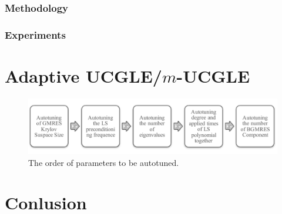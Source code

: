 \subsubsection{Methodology}
\subsubsection{Experiments}

\section{Adaptive UCGLE/$m$-UCGLE}

\begin{figure}[t]
	\centering
	\includegraphics[width=6.3in]{fig/autotuning_order.pdf}
	\caption{The order of parameters to be autotuned.}
	\label{fig:autotuning-order}
\end{figure}

\section{Conlusion}

\clearemptydoublepage